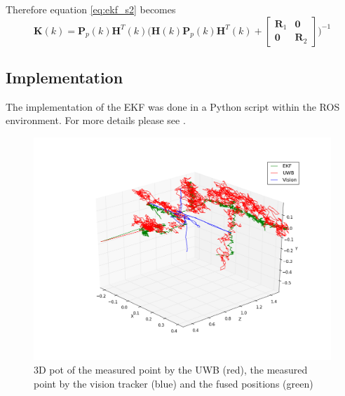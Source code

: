 Therefore equation \ref{eq:ekf_s2} becomes
$$\textbf{K}(k) = \textbf{P}_p(k) \textbf{H}^T(k) \Big( \textbf{H}(k) \textbf{P}_p(k) \textbf{H}^T(k) + \begin{bmatrix}
	\textbf{R}_1 & \textbf{0}\\
	\textbf{0} &\textbf{R}_2
\end{bmatrix} \Big)^{-1}$$

\subsection{Implementation}
The implementation of the EKF was done in a Python script within the ROS environment. For more details please see \cite{Ziegler:2016}.

\begin{figure}[ht!]\centering
	\includegraphics[width=1.0\textwidth]{figures/state_track}
	\caption{3D pot of the measured point by the UWB (red), the measured point by the vision tracker (blue) and the fused positions (green)}\label{fig:statetrack}
\end{figure}
